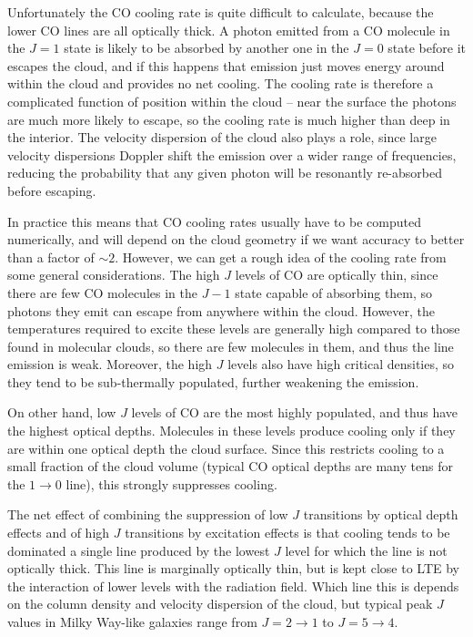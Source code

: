 Unfortunately the CO cooling rate is quite difficult to calculate, because the lower CO lines are all optically thick. A photon emitted from a CO molecule in the $J=1$ state is likely to be absorbed by another one in the $J=0$ state before it escapes the cloud, and if this happens that emission just moves energy around within the cloud and provides no net cooling. The cooling rate is therefore a complicated function of position within the cloud -- near the surface the photons are much more likely to escape, so the cooling rate is much higher than deep in the interior. The velocity dispersion of the cloud also plays a role, since large velocity dispersions Doppler shift the emission over a wider range of frequencies, reducing the probability that any given photon will be resonantly re-absorbed before escaping.

In practice this means that CO cooling rates usually have to be computed numerically, and will depend on the cloud geometry if we want accuracy to better than a factor of $\sim 2$. However, we can get a rough idea of the cooling rate from some general considerations. The high $J$ levels of CO are optically thin, since there are few CO molecules in the $J-1$ state capable of absorbing them, so photons they emit can escape from anywhere within the cloud. However, the temperatures required to excite these levels are generally high compared to those found in molecular clouds, so there are few molecules in them, and thus the line emission is weak. Moreover, the high $J$ levels also have high critical densities, so they tend to be sub-thermally populated, further weakening the emission.

On other hand, low $J$ levels of CO are the most highly populated, and thus have the highest optical depths. Molecules in these levels produce cooling only if they are within one optical depth the cloud surface. Since this restricts cooling to a small fraction of the cloud volume (typical CO optical depths are many tens for the $1\rightarrow 0$ line), this strongly suppresses cooling.

The net effect of combining the suppression of low $J$ transitions by optical depth effects and of high $J$ transitions by excitation effects is that cooling tends to be dominated a single line produced by the lowest $J$ level for which the line is not optically thick. This line is marginally optically thin, but is kept close to LTE by the interaction of lower levels with the radiation field. Which line this is depends on the column density and velocity dispersion of the cloud, but typical peak $J$ values in Milky Way-like galaxies range from $J=2\rightarrow 1$ to $J=5\rightarrow 4$.

